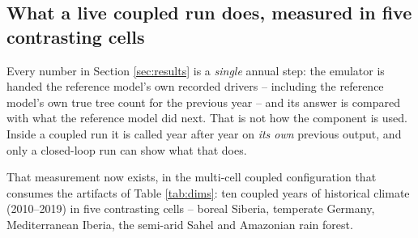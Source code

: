 \documentclass[11pt]{article}
\begin{document}
\subsection{What a live coupled run does, measured in five contrasting cells}
\label{sec:coupled}

Every number in Section \ref{sec:results} is a \emph{single} annual step: the emulator is handed the reference model's own recorded drivers -- including the reference model's own true tree count for the previous year -- and its answer is compared with what the reference model did next. That is not how the component is used. Inside a coupled run it is called year after year on \emph{its own} previous output, and only a closed-loop run can show what that does.

That measurement now exists, in the multi-cell coupled configuration that consumes the artifacts of Table \ref{tab:dims}: ten coupled years of historical climate (2010--2019) in five contrasting cells -- boreal Siberia, temperate Germany, Mediterranean Iberia, the semi-arid Sahel and Amazonian rain forest.
\end{document}
